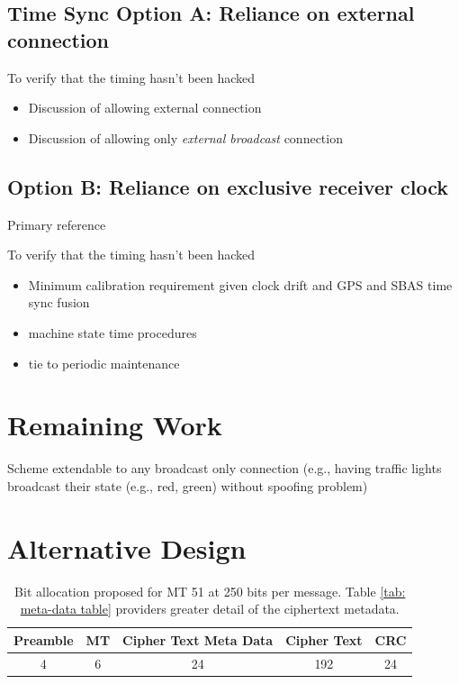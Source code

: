 \documentclass[letterpaper,times]{IONconf/IONconf}
\begin{document}
\subsection{Time Sync Option A: Reliance on external connection}

To verify that the timing hasn't been hacked
\begin{itemize}
	\item Discussion of allowing external connection
	\item Discussion of allowing only {\em external broadcast} connection
\end{itemize}

\subsection{Option B: Reliance on exclusive receiver clock}

Primary reference \cite{time_sync_paper}

To verify that the timing hasn't been hacked
\begin{itemize}
	\item Minimum calibration requirement given clock drift and GPS and SBAS time sync fusion
	\item machine state time procedures
	\item tie to periodic maintenance
\end{itemize}

\section{Remaining Work}

Scheme extendable to any broadcast only connection (e.g., having traffic lights broadcast their state (e.g., red, green) without spoofing problem)

\section*{Alternative Design}

\begin{table}[H]
\center
\begin{tabular}{|c|c|c|c|c|} \hline
	Preamble & MT & Cipher Text Meta Data & Cipher Text & CRC \\ \hline
	4 & 6 & 24 & 192 & 24 \\ \hline
\end{tabular}
\caption{Bit allocation proposed for MT 51 at 250 bits per message. Table \ref{tab: meta-data table} providers greater detail of the ciphertext metadata.}
\label{tab: high-level table1}
\end{table}
\end{document}
